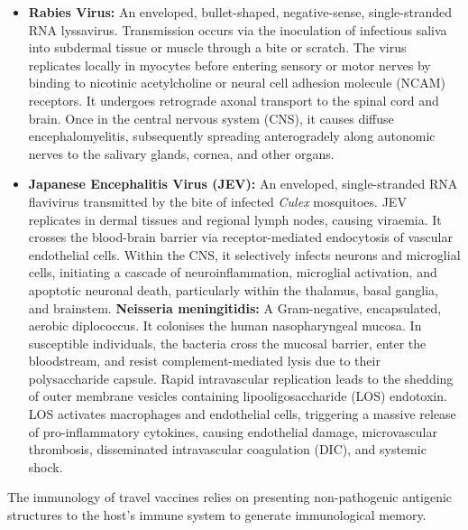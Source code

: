 \begin{itemize}
    \item \textbf{Rabies Virus:} An enveloped, bullet-shaped, negative-sense, single-stranded RNA lyssavirus. Transmission occurs via the inoculation of infectious saliva into subdermal tissue or muscle through a bite or scratch. The virus replicates locally in myocytes before entering sensory or motor nerves by binding to nicotinic acetylcholine or neural cell adhesion molecule (NCAM) receptors. It undergoes retrograde axonal transport to the spinal cord and brain. Once in the central nervous system (CNS), it causes diffuse encephalomyelitis, subsequently spreading anterogradely along autonomic nerves to the salivary glands, cornea, and other organs.
    \item \textbf{Japanese Encephalitis Virus (JEV):} An enveloped, single-stranded RNA flavivirus transmitted by the bite of infected \textit{Culex} mosquitoes. JEV replicates in dermal tissues and regional lymph nodes, causing viraemia. It crosses the blood-brain barrier via receptor-mediated endocytosis of vascular endothelial cells. Within the CNS, it selectively infects neurons and microglial cells, initiating a cascade of neuroinflammation, microglial activation, and apoptotic neuronal death, particularly within the thalamus, basal ganglia, and brainstem.
    \textbf{Neisseria meningitidis:} A Gram-negative, encapsulated, aerobic diplococcus. It colonises the human nasopharyngeal mucosa. In susceptible individuals, the bacteria cross the mucosal barrier, enter the bloodstream, and resist complement-mediated lysis due to their polysaccharide capsule. Rapid intravascular replication leads to the shedding of outer membrane vesicles containing lipooligosaccharide (LOS) endotoxin. LOS activates macrophages and endothelial cells, triggering a massive release of pro-inflammatory cytokines, causing endothelial damage, microvascular thrombosis, disseminated intravascular coagulation (DIC), and systemic shock.
\end{itemize}
The immunology of travel vaccines relies on presenting non-pathogenic antigenic structures to the host's immune system to generate immunological memory.
